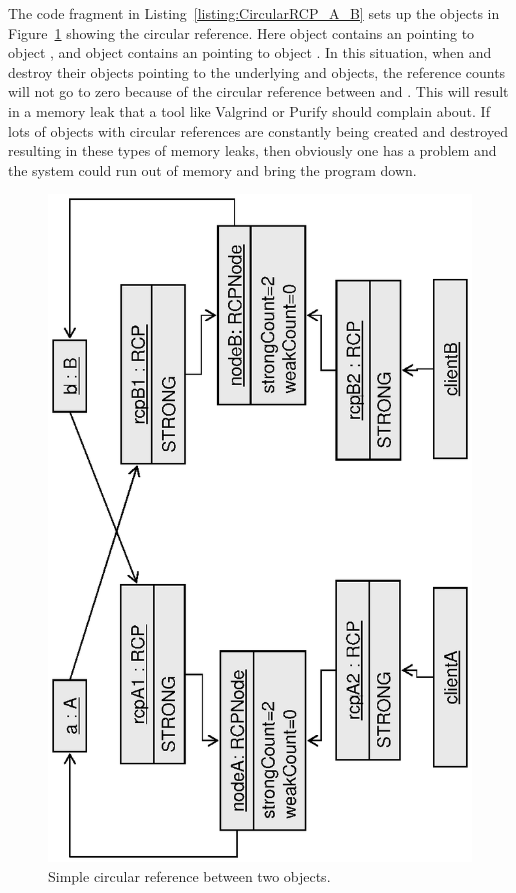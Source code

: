 \documentclass[pdf,ps2pdf,11pt]{SANDreport}
\begin{document}
The code fragment in Listing~\ref{listing:CircularRCP_A_B} sets up
the objects in Figure~\ref{fig:CircularRCP_A_B} showing the circular
reference.  Here object {} contains an {} pointing to
object {}, and object {} contains an {}
pointing to object {}.  In this situation, when {}
and {} destroy their {} objects pointing to the
underlying {} and {} objects, the reference counts will
not go to zero because of the circular reference between {} and
{}.  This will result in a memory leak that a tool like
Valgrind or Purify should complain about.  If lots of objects with
circular references are constantly being created and destroyed
resulting in these types of memory leaks, then obviously one has a
problem and the system could run out of memory and bring the program
down.


{\bsinglespace
\begin{figure}
\begin{center}
\includegraphics*[angle=270,scale=0.65]{CircularRCP_A_B}
\end{center}
\caption{
\label{fig:CircularRCP_A_B}
Simple circular reference between two objects.  }
\end{figure}
\esinglespace}
\end{document}

